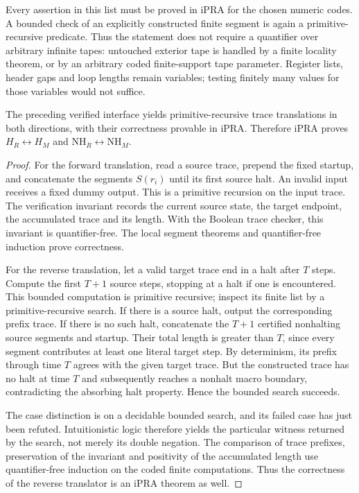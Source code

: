 Every assertion in this list must be proved in iPRA for the chosen numeric
codes. A bounded check of an explicitly constructed finite segment is again
a primitive-recursive predicate. Thus the statement does not require a
quantifier over arbitrary infinite tapes: untouched exterior tape is handled
by a finite locality theorem, or by an arbitrary coded finite-support tape
parameter. Register lists, header gaps and loop lengths remain variables;
testing finitely many values for those variables would not suffice.

\begin{proposition}
The preceding verified interface yields primitive-recursive trace
translations in both directions, with their correctness provable in iPRA.
Therefore iPRA proves $H_R\leftrightarrow H_M$ and
$\mathrm{NH}_R\leftrightarrow\mathrm{NH}_M$.
\end{proposition}

\begin{proof}
For the forward translation, read a source trace, prepend the fixed startup,
and concatenate the segments $S(r_i)$ until its first source halt. An invalid
input receives a fixed dummy output. This is a primitive recursion on the
input trace. The verification invariant records the current source state,
the target endpoint, the accumulated trace and its length. With the
Boolean trace checker, this invariant is quantifier-free. The local segment
theorems and quantifier-free induction prove correctness.

For the reverse translation, let a valid target trace end in a halt after
$T$ steps. Compute the first $T+1$ source steps, stopping at a halt if one
is encountered. This bounded computation is primitive recursive; inspect
its finite list by a primitive-recursive search. If there is a source halt,
output the corresponding prefix trace. If there is no such halt, concatenate
the $T+1$ certified nonhalting source segments and startup. Their total length
is greater than $T$, since every segment contributes at least one literal
target step. By determinism, its prefix through time $T$ agrees with the
given target trace. But the constructed trace has no halt at time $T$ and
subsequently reaches a nonhalt macro boundary, contradicting the absorbing
halt property. Hence the bounded search succeeds.

The case distinction is on a decidable bounded search, and its failed case
has just been refuted. Intuitionistic logic therefore yields the particular
witness returned by the search, not merely its double negation. The
comparison of trace prefixes, preservation of the invariant and positivity
of the accumulated length use quantifier-free induction on the coded finite
computations. Thus the correctness of the reverse translator is an iPRA
theorem as well.
\end{proof}

